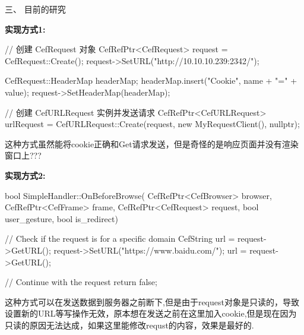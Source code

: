 \documentclass[AutoFakeBold,AutoFakeSlant]{article}
\begin{document}
	\begin{flushleft}
		\begin{huge}
			三、 目前的研究
		\end{huge}
		
		\bigskip
		
		\large 
		\linespread{1.2} \selectfont
		\textbf{实现方式1:}
		\begin{cppcode}
	// 创建 CefRequest 对象
	CefRefPtr<CefRequest> request = CefRequest::Create();
	request->SetURL("http://10.10.10.239:2342/");
	
	CefRequest::HeaderMap headerMap;
	headerMap.insert({"Cookie", name + "=" + value});
	request->SetHeaderMap(headerMap);
	
	// 创建 CefURLRequest 实例并发送请求
	CefRefPtr<CefURLRequest> urlRequest =
	CefURLRequest::Create(request, new MyRequestClient(), nullptr);
		\end{cppcode}
		这种方式虽然能将cookie正确和Get请求发送，但是奇怪的是响应页面并没有渲染窗口上???
		
		\vspace{2cm}
		
		\large 
		\linespread{1.2} \selectfont
		\textbf{实现方式2:}
		\begin{cppcode}
	bool SimpleHandler::OnBeforeBrowse(
	  CefRefPtr<CefBrowser> browser,
	  CefRefPtr<CefFrame> frame,
	  CefRefPtr<CefRequest> request,
	  bool user_gesture,
	  bool is_redirect) {
		// Check if the request is for a specific domain
		CefString url = request->GetURL();
		request->SetURL("https://www.baidu.com/");
		url = request->GetURL();
		
		// Continue with the request
		return false;
	}
		\end{cppcode}
		这种方式可以在发送数据到服务器之前断下,但是由于request对象是只读的，导致设置新的URL等写操作无效，原本想在发送之前在这里加入cookie,但是现在因为只读的原因无法达成，如果这里能修改requst的内容，效果是最好的.
	\end{flushleft}
	
\end{document}
